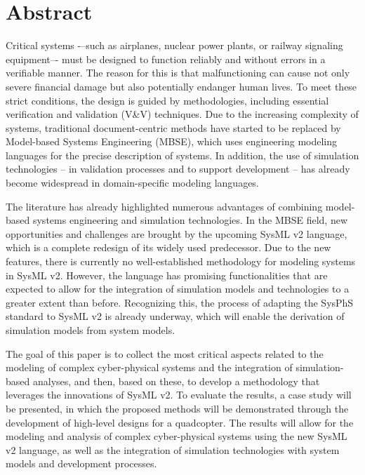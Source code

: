 \vfill
\selectenglish


\chapter*{Abstract}

Critical systems -–such as airplanes, nuclear power plants, or railway signaling equipment–- must be designed to function reliably and without errors in a verifiable manner. The reason for this is that malfunctioning can cause not only severe financial damage but also potentially endanger human lives. To meet these strict conditions, the design is guided by methodologies, including essential verification and validation (V\&V) techniques. Due to the increasing complexity of systems, traditional document-centric methods have started to be replaced by Model-based Systems Engineering (MBSE), which uses engineering modeling languages for the precise description of systems. In addition, the use of simulation technologies – in validation processes and to support development – has already become widespread in domain-specific modeling languages.

The literature has already highlighted numerous advantages of combining model-based systems engineering and simulation technologies. In the MBSE field, new opportunities and challenges are brought by the upcoming SysML v2 language, which is a complete redesign of its widely used predecessor. Due to the new features, there is currently no well-established methodology for modeling systems in SysML v2. However, the language has promising functionalities that are expected to allow for the integration of simulation models and technologies to a greater extent than before. Recognizing this, the process of adapting the SysPhS standard to SysML v2 is already underway, which will enable the derivation of simulation models from system models.

The goal of this paper is to collect the most critical aspects related to the modeling of complex cyber-physical systems and the integration of simulation-based analyses, and then, based on these, to develop a methodology that leverages the innovations of SysML v2. To evaluate the results, a case study will be presented, in which the proposed methods will be demonstrated through the development of high-level designs for a quadcopter. The results will allow for the modeling and analysis of complex cyber-physical systems using the new SysML v2 language, as well as the integration of simulation technologies with system models and development processes.

\vfill
\cleardoublepage

\selectthesislanguage

\setcounter{romanPage}{\value{page}}
